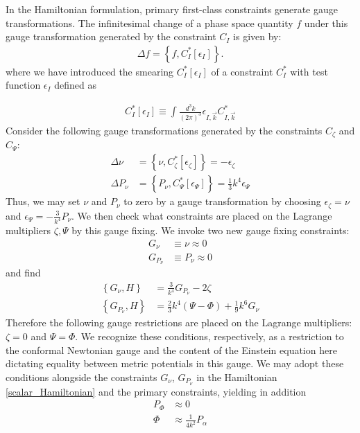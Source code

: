 \documentclass[twocolumn,prd,preprintnumbers,amsmath,amssymb,nofootinbib,superscriptaddress]{revtex4-1}
\newcommand{\Poisson}[2]{\ensuremath{ \left\{ #1, #2\right\} }}
\newcommand{\eps}{\epsilon}
\begin{document}
 In the Hamiltonian formulation, primary first-class constraints generate gauge transformations. The infinitesimal change of a phase space quantity $f$ under this gauge transformation 
generated by the constraint $C_{I}$ is given by:
\begin{align}
\Delta f = \Poisson{f}{C_{I}^*[\eps_{I}]}.
\end{align}
%
%
where we have introduced the smearing $C^{*}_{I}[\eps_{I}]$ of a constraint $C^{*}_{I}$ with test function $\eps_{I}$ defined as 

\begin{align}
	C^{*}_{I}[\eps_{I}] \equiv \int \frac{d^3k}{(2\pi)^{3}} \eps_{I,\vec{k}}C^{*}_{I,\vec{k}}
\end{align}
%
Consider the following gauge transformations generated by the constraints $C_{\zeta}$ and $C_{\Psi}$:
\begin{align}
\Delta \nu &= \Poisson{\nu}{ C_{\zeta}^*[\eps_{\zeta}]} = - \eps_{\zeta} 
\\
\Delta P_{\nu} &= \Poisson{P_{\nu}}{ C_{\Psi}^*[\eps_{\Psi}]} =  \frac{1}{3}k^{4}\eps_{\Psi}
\end{align}
Thus, we may set $\nu$ and $P_{\nu}$ to zero by a gauge transformation by choosing $\eps_{\zeta} = \nu$ and $\eps_{\Psi}= -\frac{3}{k^{4}}P_{\nu}$.
We then check what constraints are placed on the Lagrange multipliers $\zeta,\Psi$ by this gauge fixing. We invoke two new gauge fixing constraints:
\begin{align}
G_{\nu}  &\equiv \nu \approx 0 \\
G_{P_{\nu}} &\equiv  P_{\nu} \approx 0
\end{align}
and find
\begin{align}
\Poisson{G_{\nu}}{H} &= \frac{3}{k^{4}}G_{P_{\nu}} -2\zeta
\\
\Poisson{G_{P_{\nu}}}{H} &= \frac{2}{3}k^{4}\left(\Psi-\Phi\right) + \frac{1}{9}k^{6}G_{\nu}
\end{align}
%
Therefore the following gauge restrictions are placed on the Lagrange multipliers: $\zeta = 0$ and $\Psi = \Phi$. 
We recognize these conditions, respectively, as a restriction to the conformal Newtonian gauge and the content of the Einstein equation here dictating equality between metric potentials in this gauge. 
We may adopt these conditions alongside the constraints $G_{\nu}$, $G_{P_{\nu}}$ in the Hamiltonian \eqref{scalar_Hamiltonian} and the primary constraints, yielding in addition 
\begin{align}
P_\Phi &\approx 0
\\
\Phi &\approx \frac{1}{4k^2} P_\alpha
\end{align}
\end{document}

